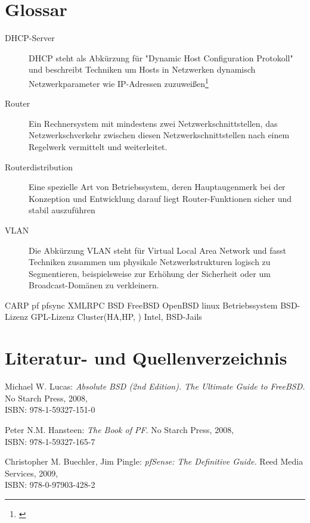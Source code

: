 \documentclass[a4paper,12pt]{scrartcl}
\begin{document}
\section{Glossar}
\begin{description}
 \item[DHCP-Server] DHCP steht als Abk\"urzung f\"ur "Dynamic Host
Configuration Protokoll" und beschreibt Techniken um Hosts in Netzwerken
dynamisch Netzwerkparameter wie IP-Adressen zuzuwei\ss{}en\footnote{\cite{dhcp}}
 \item[Router] Ein Rechnersystem mit mindestens zwei Netzwerkschnittstellen,
das Netzwerkschverkehr zwischen diesen Netzwerkschnittstellen nach einem
Regelwerk vermittelt und weiterleitet.
 \item[Routerdistribution] Eine spezielle Art von Betriebssystem, deren
Hauptaugenmerk bei der Konzeption und Entwicklung darauf liegt
Router-Funktionen sicher und stabil auszuf\"uhren
 \item[VLAN] Die Abk\"urzung VLAN steht f\"ur Virtual Local Area Network und
fasst Techniken zusammen um physikale Netzwerkstrukturen logisch zu
Segmentieren, beispielsweise zur Erh\"ohung der Sicherheit oder um
Broadcast-Dom\"anen zu verkleinern.
\end{description}
CARP pf pfsync XMLRPC BSD FreeBSD OpenBSD linux Betriebssystem BSD-Lizenz GPL-Lizenz Cluster(HA,HP, ) Intel, BSD-Jails

\clearpage

\section{Literatur- und Quellenverzeichnis}

\renewcommand\refname{Literaturverzeichnis}
\begin{thebibliography}{999}

Michael W. Lucas:  {\sl Absolute BSD (2nd Edition). The Ultimate Guide to FreeBSD.} No Starch Press, 2008,
\\ISBN: 978-1-59327-151-0

Peter N.M. Hansteen:  {\sl The Book of PF}. No Starch Press, 2008,
\\ISBN: 978-1-59327-165-7

Christopher M. Buechler, Jim Pingle: {\sl pfSense: The Definitive Guide.} Reed Media Services, 2009,
\\ISBN: 978-0-97903-428-2

\end{thebibliography}
\end{document}
